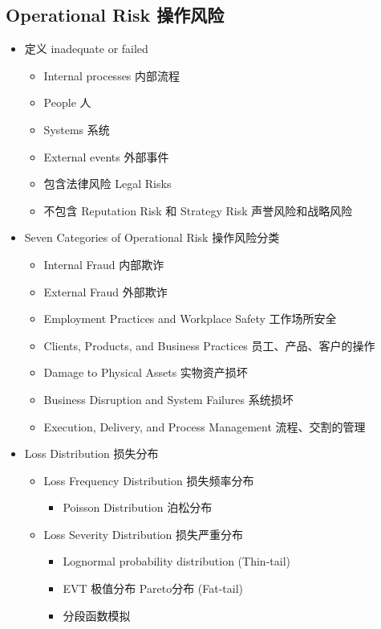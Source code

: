 \documentclass[a4paper,6pt,twoside,openany]{article}
\begin{document}
\subsection{Operational Risk 操作风险}
\begin{itemize}
\item 定义 inadequate or failed
  \begin{itemize}
  \item Internal processes 内部流程
  \item People 人
  \item Systems 系统
  \item External events 外部事件
  \item 包含法律风险 Legal Risks
  \item 不包含 Reputation Risk 和 Strategy Risk 声誉风险和战略风险
  \end{itemize}
\item Seven Categories of Operational Risk 操作风险分类
  \begin{itemize}
  \item Internal Fraud 内部欺诈
  \item External Fraud 外部欺诈
  \item Employment Practices and Workplace Safety 工作场所安全
  \item Clients, Products, and Business Practices 员工、产品、客户的操作
  \item Damage to Physical Assets 实物资产损坏
  \item Business Disruption and System Failures 系统损坏
  \item Execution, Delivery, and Process Management 流程、交割的管理
  \end{itemize}
\item Loss Distribution 损失分布
  \begin{itemize}
  \item Loss Frequency Distribution 损失频率分布
    \begin{itemize}
    \item Poisson Distribution 泊松分布
    \end{itemize}
  \item Loss Severity Distribution 损失严重分布
    \begin{itemize}
    \item Lognormal probability distribution (Thin-tail)
    \item EVT 极值分布 Pareto分布 (Fat-tail)
    \item 分段函数模拟
    \end{itemize}

\end{itemize}
\end{itemize}
\end{document}

